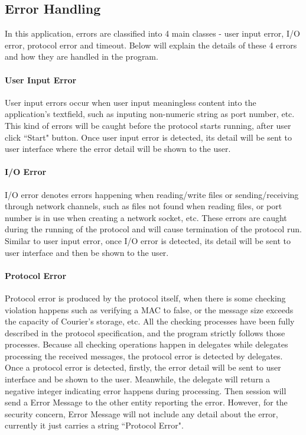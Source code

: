 \subsection{Error Handling}
In this application, errors are classified into 4 main classes - user input error, I/O error, protocol error and timeout. Below will explain the details of these 4 errors and how they are handled in the program.
\paragraph{User Input Error}
User input errors occur when user input meaningless content into the application's textfield, such as inputing non-numeric string as port number, etc. This kind of errors will be caught before the protocol starts running, after user click ``Start" button. Once user input error is detected, its detail will be sent to user interface where the error detail will be shown to the user.
\paragraph{I/O Error}
I/O error denotes errors happening when reading/write files or sending/receiving through network channels, such as files not found when reading files, or port number is in use when creating a network socket, etc. These errors are caught during the running of the protocol and will cause termination of the protocol run. Similar to user input error, once I/O error is detected, its detail will be sent to user interface and then be shown to the user.
\paragraph{Protocol Error}
Protocol error is produced by the protocol itself, when there is some checking violation happens such as verifying a MAC to false, or the message size exceeds the capacity of Courier's storage, etc. All the checking processes have been fully described in the protocol specification, and the program strictly follows those processes. Because all checking operations happen in delegates while delegates processing the received messages, the protocol error is detected by delegates. Once a protocol error is detected, firstly, the error detail will be sent to user interface and be shown to the user. Meanwhile, the delegate will return a negative integer indicating error happens during processing. Then session will send a Error Message to the other entity reporting the error. However, for the security concern, Error Message will not include any detail about the error, currently it just carries a string ``Protocol Error".
